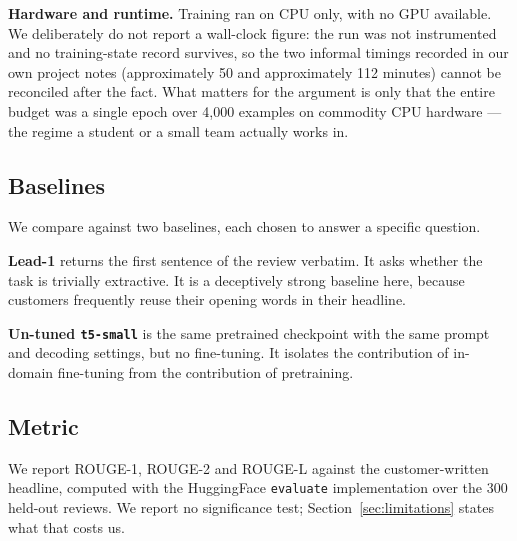 \textbf{Hardware and runtime.} Training ran on CPU only, with no GPU available.
We deliberately do not report a wall-clock figure: the run was not instrumented
and no training-state record survives, so the two informal timings recorded in
our own project notes (approximately 50 and approximately 112 minutes)
cannot be reconciled after the fact. What matters for the argument is only that
the entire budget was a single epoch over 4{,}000 examples on commodity CPU
hardware --- the regime a student or a small team actually works in.

\subsection{Baselines}

We compare against two baselines, each chosen to answer a specific question.

\textbf{Lead-1} returns the first sentence of the review verbatim. It asks
whether the task is trivially extractive. It is a deceptively strong baseline
here, because customers frequently reuse their opening words in their headline.

\textbf{Un-tuned \texttt{t5-small}} is the same pretrained checkpoint with the
same prompt and decoding settings, but no fine-tuning. It isolates the
contribution of in-domain fine-tuning from the contribution of pretraining.

\subsection{Metric}

We report ROUGE-1, ROUGE-2 and ROUGE-L \cite{lin2004rouge} against the
customer-written headline, computed with the HuggingFace \texttt{evaluate}
implementation over the 300 held-out reviews. We report no significance test;
Section~\ref{sec:limitations} states what that costs us.
